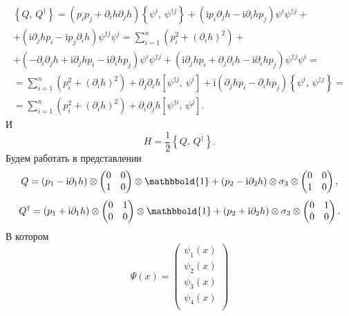 \documentclass[a4paper, 14pt]{extarticle}
\begin{document}
\begin{sol}
\begin{multline*}
\left\{ Q,\,Q^\dagger \right\} =
\left(p_i p_j +\partial_i h \partial_j h\right)\left\{ \psi^i,\,\psi^{\dagger j} \right\}  +\left( 
\mathrm{i} p_i \partial_j h-\mathrm{i} \partial_i h p_j\right) \psi^i \psi^{\dagger j}+\\+
\left( \mathrm{i} \partial_j h p_i - \mathrm{i} p_j
\partial_i h\right) \psi^{\dagger j}\psi^{i}=
\sum_{i=1}^{n} \left( p_i^2 +\left( \partial_i h \right) ^2 \right) +\\+
\left( -\partial_i \partial_j h+\mathrm{i} \partial_j h
p_i-\mathrm{i} \partial_i h p_j\right) \psi^i \psi^{\dagger j}+ \left( \mathrm{i} \partial_j h p_i + \partial_j \partial_i h-\mathrm{i} \partial_ih p_j \right) \psi^{\dagger
j }\psi^i=\\=
\sum_{i=1}^{n} \left( p_i^2 +\left( \partial_i h \right) ^2 \right) +\partial_j \partial_i h \left[ \psi^{\dagger j},\,
	\psi^i\right] +\mathrm{i} \left(\partial_j h p_i -
	\partial_i h p_j\right)\left\{ 
\psi^i,\,\psi^{\dagger j}\right\} =\\=
\sum_{i=1}^{n} \left( p_i^2 +\left( \partial_i h \right) ^2 \right) + \partial_i \partial_j h  \left[ 
\psi^{\dagger i},\,\psi^j\right] 
.\end{multline*} 
И
\[
H=\frac{1}{2} \left\{ Q,\,Q^\dagger\right\} 
.\] 
Будем работать в представлении
\[
	Q= \left( 
	p_1 -\mathrm{i}  \partial_1 h \right) \otimes 
	\begin{pmatrix} 0&0\\1&0 \end{pmatrix}\otimes \mathbbold{1} +
	\left(p_2 -\mathrm{i}  \partial_2 h \right)\otimes  \sigma_3
	\otimes \begin{pmatrix} 0&0\\1&0 \end{pmatrix}
,\] 
\[
	Q^\dagger= \left( 
	p_1 +\mathrm{i}  \partial_1 h \right) \otimes 
	\begin{pmatrix} 0&1\\0&0 \end{pmatrix}\otimes \mathbbold{1} +
	\left(p_2 +\mathrm{i}  \partial_2 h \right)\otimes  \sigma_3
	\otimes \begin{pmatrix} 0&1\\0&0 \end{pmatrix}
.\]
В котором
\[
	\Psi(x)= \begin{pmatrix} \psi_1(x)\\ \psi_2(x)\\ \psi_3(x)\\ \psi_4(x)\\ \end{pmatrix} 
\]
\end{sol}
\end{document}
